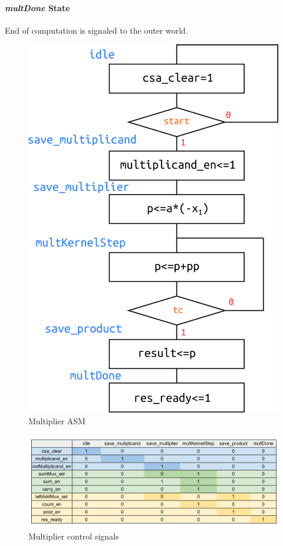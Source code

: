 \paragraph{\textit{multDone} State}
End of computation is signaled to the outer world.
\begin{figure}[H]
    \centering
    \includegraphics[scale=1]{pics/multiplierASM.png}
    \caption{Multiplier ASM}
    \label{fig:my_label}
\end{figure}
\begin{figure}[H]
\centering
\includegraphics[scale=0.35]{pics/multControl.png}
    \caption{Multiplier control signals}
    \label{fig:my_label}
\end{figure}

